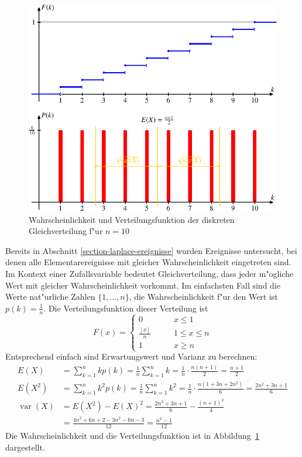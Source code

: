 \begin{figure}
\centering
\includegraphics{images/gl-2.pdf}
\caption{Wahrscheinlichkeit und Verteilungsfunktion der diskreten Gleichverteilung
f"ur $n=10$
\label{graph-diskrete-gleichverteilung}}
\end{figure}

Bereits in Abschnitt \ref{section-laplace-ereignisse}
wurden Ereignisse
untersucht, bei denen alle Elementarereignisse mit gleicher Wahrscheinlichkeit
eingetreten sind.
Im Kontext einer Zufallsvariable bedeutet
Gleichverteilung, dass jeder m"ogliche Wert mit gleicher Wahrscheinlichkeit
vorkommt.
Im einfachsten Fall sind die Werte nat"urliche Zahlen
$\{1,\dots,n\}$, die Wahrscheinlichkeit f"ur den Wert ist 
$p(k)=\frac1n$.
Die Verteilungsfunktion dieser Verteilung ist
\[
F(x)=
\begin{cases}
0&\qquad x \le 1\\
{\displaystyle \frac{\left\lfloor x\right\rfloor}n}&\qquad 1\le x\le n\\
1&\qquad x \ge n
\end{cases}
\]
Entsprechend einfach sind Erwartungswert und Varianz zu berechnen:
{\allowdisplaybreaks
\begin{align*}
E(X)&=\sum_{k=1}^nkp(k)=\frac1n\sum_{k=1}^nk=\frac1n\cdot\frac{n(n+1)}{2}=\frac{n+1}2\\
E(X^2)&=\sum_{k=1}^nk^2p(k)=\frac1n\sum_{k=1}^nk^2=\frac1n\cdot\frac{n(1+3n+2n^2)}{6}=\frac{2n^2+3n+1}{6}\\
\operatorname{var}(X)&=E(X^2)-E(X)^2=\frac{2n^2+3n+1}{6}-\frac{(n+1)^2}4\\
&=\frac{4n^2+6n+2-3n^2-6n-3}{12}=\frac{n^2-1}{12}
\end{align*}
}
Die Wahrscheinlichkeit und die Verteilungsfunktion ist in
Abbildung~\ref{graph-diskrete-gleichverteilung} dargestellt.
